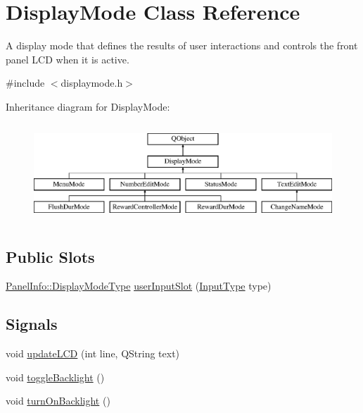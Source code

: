 \hypertarget{class_display_mode}{\section{Display\-Mode Class Reference}
\label{class_display_mode}
}


A display mode that defines the results of user interactions and controls the front panel L\-C\-D when it is active.  




{\ttfamily \#include $<$displaymode.\-h$>$}

Inheritance diagram for Display\-Mode\-:\begin{figure}[H]
\begin{center}
\leavevmode
\includegraphics[height=3.708609cm]{class_display_mode}
\end{center}
\end{figure}
\subsection*{Public Slots}
\begin{DoxyCompactItemize}
\item 
\hyperlink{namespace_panel_info_adb8b98e092c15e831aa524d39701d565}{Panel\-Info\-::\-Display\-Mode\-Type} \hyperlink{class_display_mode_ae3ba1617fac36e0cea757a12575fffa7}{user\-Input\-Slot} (\hyperlink{namespace_panel_info_aeeb3b627166cd15c3898f93a1a499c65}{Input\-Type} type)
\end{DoxyCompactItemize}
\subsection*{Signals}
\begin{DoxyCompactItemize}
\item 
void \hyperlink{class_display_mode_a2ebabc8a9ccbdea91a7b10cf65c6a8f3}{update\-L\-C\-D} (int line, Q\-String text)
\item 
void \hyperlink{class_display_mode_a829f2d5b0b2e97d8b7d344ecc3ef1143}{toggle\-Backlight} ()
\item 
void \hyperlink{class_display_mode_af5413cbc17b6b9cf50097906a89e4ee7}{turn\-On\-Backlight} ()
\end{DoxyCompactItemize}
